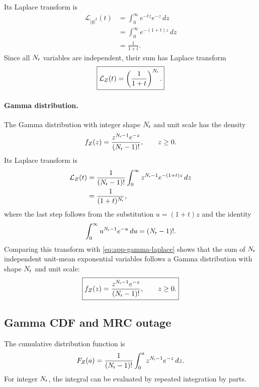 Its Laplace transform is
\begin{align*}
	\mathcal{L}_{|g|^2}(t)
	&=\int_0^\infty e^{-tz}e^{-z}\,dz\\
	&=\int_0^\infty e^{-(1+t)z}\,dz\\
	&=\frac{1}{1+t}.
\end{align*}
Since all $N_{\mathsf{r}}$ variables are independent, their sum has Laplace transform
\begin{equation}\label{eq:app-gamma-laplace}
	\boxed{
		\mathcal{L}_Z(t)
		=\left(\frac{1}{1+t}\right)^{N_{\mathsf{r}}}.
	}
\end{equation}

\paragraph{Gamma distribution.}
The Gamma distribution with integer shape $N_{\mathsf{r}}$ and unit scale has the density
\begin{equation*}
	f_Z(z)=\frac{z^{N_{\mathsf{r}}-1}e^{-z}}{(N_{\mathsf{r}}-1)!},
	\qquad z\geq0.
\end{equation*}
Its Laplace transform is
\begin{align*}
	\mathcal{L}_Z(t)
	&=\frac{1}{(N_{\mathsf{r}}-1)!}
	\int_0^\infty z^{N_{\mathsf{r}}-1}e^{-(1+t)z}\,dz\\
	&=\frac{1}{(1+t)^{N_{\mathsf{r}}}},
\end{align*}
where the last step follows from the substitution $u=(1+t)z$ and the identity
\begin{equation*}
	\int_0^\infty u^{N_{\mathsf{r}}-1}e^{-u}\,du
	=(N_{\mathsf{r}}-1)!.
\end{equation*}
Comparing this transform with \eqref{eq:app-gamma-laplace} shows that the sum of $N_{\mathsf{r}}$ independent unit-mean exponential variables follows a Gamma distribution with shape $N_{\mathsf{r}}$ and unit scale:
\begin{equation}\label{eq:app-gamma-pdf}
	\boxed{
		f_Z(z)
		=\frac{z^{N_{\mathsf{r}}-1}e^{-z}}{(N_{\mathsf{r}}-1)!},
		\qquad z\geq0.
	}
\end{equation}
\subsection{Gamma CDF and MRC outage}

The cumulative distribution function is
\begin{equation*}
	F_Z(a)
	=\frac{1}{(N_{\mathsf{r}}-1)!}
	\int_0^a z^{N_{\mathsf{r}}-1}e^{-z}\,dz.
\end{equation*}
For integer $N_{\mathsf{r}}$, the integral can be evaluated by repeated integration by parts.

